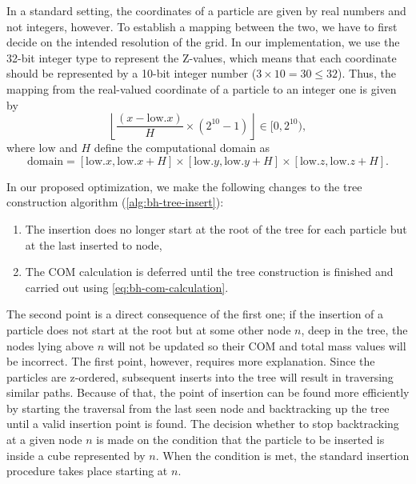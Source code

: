 In a standard setting, the coordinates of a particle are given by real numbers and not integers, however.
To establish a mapping between the two, we have to first decide on the intended resolution of the grid.
In our implementation, we use the 32-bit integer type to represent the Z-values, which means that each coordinate should be represented by a 10-bit integer number ($3 \times 10 = 30 \leq 32$).
Thus, the mapping from the real-valued coordinate of a particle to an integer one is given by
\begin{equation*}
    \left\lfloor \frac{(x - \text{low}.x)}{H} \times (2^{10} - 1)\right\rfloor \in [0, 2^{10}),
\end{equation*}
where $\text{low}$ and $H$ define the computational domain as
\begin{equation*}
    \text{domain} = [\text{low}.x, \text{low}.x + H] \times [\text{low}.y, \text{low}.y + H] \times [\text{low}.z, \text{low}.z + H].
\end{equation*}

In our proposed optimization, we make the following changes to the tree construction algorithm (\autoref{alg:bh-tree-insert}):
\begin{enumerate}
    \item The insertion does no longer start at the root of the tree for each particle but at the last inserted to node,
    \item The COM calculation is deferred until the tree construction is finished and carried out using \autoref{eq:bh-com-calculation}.
\end{enumerate}
The second point is a direct consequence of the first one;
if the insertion of a particle does not start at the root but at some other node $n$, deep in the tree, the nodes lying above $n$ will not be updated so their COM and total mass values will be incorrect.
The first point, however, requires more explanation.
Since the particles are z-ordered, subsequent inserts into the tree will result in traversing similar paths.
Because of that, the point of insertion can be found more efficiently by starting the traversal from the last seen node and backtracking up the tree until a valid insertion point is found.
The decision whether to stop backtracking at a given node $n$ is made on the condition that the particle to be inserted is inside a cube represented by $n$.
When the condition is met, the standard insertion procedure takes place starting at $n$.

